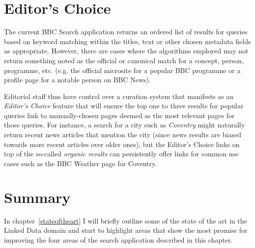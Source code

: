 \section{Editor's Choice}

The current BBC Search application returns an ordered list of results
for queries based on keyword matching within the titles, text or other
chosen metadata fields as appropriate. However, there are cases where
the algorithms employed may not return something noted as the official
or canonical match for a concept, person, programme, etc. (e.g. the
official microsite for a popular BBC programme or a profile page for
a notable person on BBC News).

Editorial staff thus have control over a curation system that manifests
as an \emph{Editor's Choice} feature that will ensure the top one to three
results for popular queries link to manually-chosen pages deemed as the most
relevant pages for those queries. For instance, a search for a city such
as \emph{Coventry} might naturally return recent news articles that mention the
city (since news results are biased towards more recent articles over older
ones), but the Editor's Choice links on top of the so-called \emph{organic
results} can persistently offer links for common use cases such as
the BBC Weather page for Coventry.

\section{Summary}

In chapter~\ref{stateoftheart} I will briefly outline some of the state of the
art in the Linked Data domain and start to highlight areas that show
the most promise for improving the four areas of the search application
described in this chapter.
